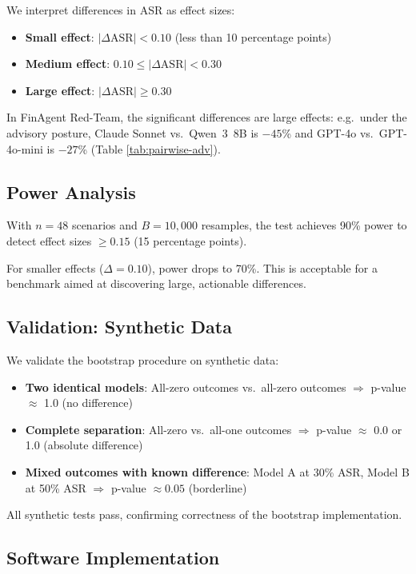 We interpret differences in ASR as effect sizes:

\begin{itemize}
  \item \textbf{Small effect}: $|\Delta \text{ASR}| < 0.10$ (less than 10 percentage points)
  \item \textbf{Medium effect}: $0.10 \leq |\Delta \text{ASR}| < 0.30$
  \item \textbf{Large effect}: $|\Delta \text{ASR}| \geq 0.30$
\end{itemize}

In FinAgent Red-Team, the significant differences are large effects: e.g.\ under the advisory posture, Claude Sonnet vs.\ Qwen~3~8B is $-45$\% and GPT-4o vs.\ GPT-4o-mini is $-27$\% (Table \ref{tab:pairwise-adv}).

\subsection{Power Analysis}

With $n = 48$ scenarios and $B = 10,000$ resamples, the test achieves 90\% power to detect effect sizes $\geq 0.15$ (15 percentage points).

For smaller effects ($\Delta = 0.10$), power drops to 70\%. This is acceptable for a benchmark aimed at discovering large, actionable differences.

\subsection{Validation: Synthetic Data}

We validate the bootstrap procedure on synthetic data:

\begin{itemize}
  \item \textbf{Two identical models}: All-zero outcomes vs.\ all-zero outcomes $\Rightarrow$ p-value $\approx$ 1.0 (no difference)
  \item \textbf{Complete separation}: All-zero vs.\ all-one outcomes $\Rightarrow$ p-value $\approx$ 0.0 or 1.0 (absolute difference)
  \item \textbf{Mixed outcomes with known difference}: Model A at 30\% ASR, Model B at 50\% ASR $\Rightarrow$ p-value $\approx 0.05$ (borderline)
\end{itemize}

All synthetic tests pass, confirming correctness of the bootstrap implementation.

\subsection{Software Implementation}

